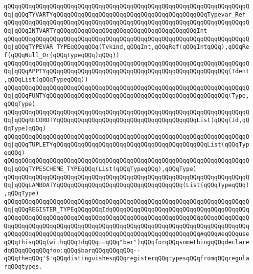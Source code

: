 \verb|qQQqqQQqqQQqqQQqqQQqqQQqqQQqqQQqqQQqqQQqqQQqqQQqqQQqqQQqqQQqqQQqqQQqqQQq|\verb#|qQQqTYVARTYqQQqqQQqqQQqqQQqqQQqqQQqqQQqqQQqqQQqqQQqqQQqTypevar_Ref#\newline
\verb|qQQqqQQqqQQqqQQqqQQqqQQqqQQqqQQqqQQqqQQqqQQqqQQqqQQqqQQqqQQqqQQqqQQqqQQq|\verb#|qQQqINTVARTYqQQqqQQqqQQqqQQqqQQqqQQqqQQqqQQqqQQqqQQqInt#\newline
\verb|qQQqqQQqqQQqqQQqqQQqqQQqqQQqqQQqqQQqqQQqqQQqqQQqqQQqqQQqqQQqqQQqqQQqqQQq|\verb#|qQQqTYPEVAR_TYPEqQQqqQQq(Tvkind,qQQqInt,qQQqRef(qQQqIntqQQq),qQQqRef(qQQqNull_Or(qQQqTypeqQQq)qQQq))#\newline
\verb|qQQqqQQqqQQqqQQqqQQqqQQqqQQqqQQqqQQqqQQqqQQqqQQqqQQqqQQqqQQqqQQqqQQqqQQq|\verb#|qQQqAPPTYqQQqqQQqqQQqqQQqqQQqqQQqqQQqqQQqqQQqqQQqqQQqqQQqqQQq(Ident,qQQqList(qQQqTypeqQQq))#\newline
\verb|qQQqqQQqqQQqqQQqqQQqqQQqqQQqqQQqqQQqqQQqqQQqqQQqqQQqqQQqqQQqqQQqqQQqqQQq|\verb#|qQQqFUNTYqQQqqQQqqQQqqQQqqQQqqQQqqQQqqQQqqQQqqQQqqQQqqQQqqQQq(Type,qQQqType)#\newline
\verb|qQQqqQQqqQQqqQQqqQQqqQQqqQQqqQQqqQQqqQQqqQQqqQQqqQQqqQQqqQQqqQQqqQQqqQQq|\verb#|qQQqRECORDTYqQQqqQQqqQQqqQQqqQQqqQQqqQQqqQQqqQQqqQQqList(qQQq(Id,qQQqType)qQQq)#\newline
\verb|qQQqqQQqqQQqqQQqqQQqqQQqqQQqqQQqqQQqqQQqqQQqqQQqqQQqqQQqqQQqqQQqqQQqqQQq|\verb#|qQQqTUPLETYqQQqqQQqqQQqqQQqqQQqqQQqqQQqqQQqqQQqqQQqqQQqList(qQQqTypeqQQq)#\newline
\verb|qQQqqQQqqQQqqQQqqQQqqQQqqQQqqQQqqQQqqQQqqQQqqQQqqQQqqQQqqQQqqQQqqQQqqQQq|\verb#|qQQqTYPESCHEME_TYPEqQQq(List(qQQqTypeqQQq),qQQqType)#\newline
\verb|qQQqqQQqqQQqqQQqqQQqqQQqqQQqqQQqqQQqqQQqqQQqqQQqqQQqqQQqqQQqqQQqqQQqqQQq|\verb#|qQQqLAMBDATYqQQqqQQqqQQqqQQqqQQqqQQqqQQqqQQqqQQq(List(qQQqTypeqQQq),qQQqType)#\newline
\newline
\verb|qQQqqQQqqQQqqQQqqQQqqQQqqQQqqQQqqQQqqQQqqQQqqQQqqQQqqQQqqQQqqQQqqQQqqQQq|\verb#|qQQqREGISTER_TYPEqQQqqQQqIdqQQqqQQqqQQqqQQqqQQqqQQqqQQqqQQqqQQqqQQqqQQqqQQqqQQqqQQqqQQqqQQqqQQqqQQqqQQqqQQqqQQqqQQqqQQqqQQqqQQqqQQqqQQqqQQqqQQqqQQqqQQqqQQqqQQqqQQqqQQqqQQqqQQqqQQqqQQqqQQqqQQqqQQqqQQqqQQqqQQqqQQqqQQqqQQqqQQqqQQqqQQqqQQqqQQqqQQqqQQqqQQqqQQqqQQqqQQq#\verb|#qQQqWeqQQquseqQQqthisqQQq(withqQQqIdqQQq==qQQq"bar")qQQqforqQQqsomethingqQQqdeclaredqQQqqQQqqQQqfoo:qQQq$barqQQqqQQqqQQq--qQQqtheqQQq'$'qQQqdistinguishesqQQqregisterqQQqtypesqQQqfromqQQqregularqQQqtypes.|\newline
\newline
